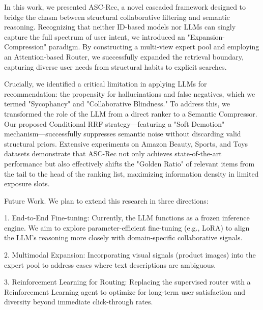 \documentclass[]{article}
\begin{document}
In this work, we presented ASC-Rec, a novel cascaded framework designed
to bridge the chasm between structural collaborative filtering and
semantic reasoning. Recognizing that neither ID-based models nor LLMs
can singly capture the full spectrum of user intent, we introduced an
"Expansion-Compression" paradigm. By constructing a multi-view expert
pool and employing an Attention-based Router, we successfully expanded
the retrieval boundary, capturing diverse user needs from structural
habits to explicit searches.

Crucially, we identified a critical limitation in applying LLMs for
recommendation: the propensity for hallucinations and false negatives,
which we termed "Sycophancy" and "Collaborative Blindness." To address
this, we transformed the role of the LLM from a direct ranker to a
Semantic Compressor. Our proposed Conditional RRF strategy---featuring a
"Soft Demotion" mechanism---successfully suppresses semantic noise
without discarding valid structural priors. Extensive experiments on
Amazon Beauty, Sports, and Toys datasets demonstrate that ASC-Rec not
only achieves state-of-the-art performance but also effectively shifts
the "Golden Ratio" of relevant items from the tail to the head of the
ranking list, maximizing information density in limited exposure slots.

Future Work. We plan to extend this research in three directions:

1. End-to-End Fine-tuning: Currently, the LLM functions as a frozen
inference engine. We aim to explore parameter-efficient fine-tuning
(e.g., LoRA) to align the LLM's reasoning more closely with
domain-specific collaborative signals.

2. Multimodal Expansion: Incorporating visual signals (product images)
into the expert pool to address cases where text descriptions are
ambiguous.

3. Reinforcement Learning for Routing: Replacing the supervised router
with a Reinforcement Learning agent to optimize for long-term user
satisfaction and diversity beyond immediate click-through rates.
\end{document}
